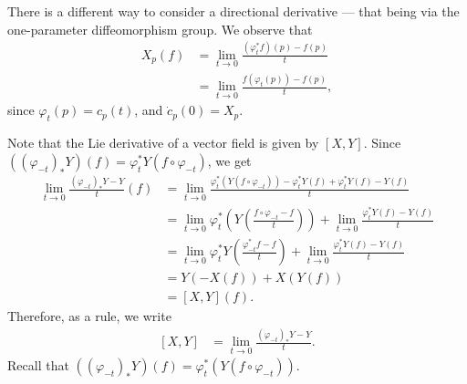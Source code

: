 \documentclass[10pt]{mypackage}
\begin{document}
There is a different way to consider a directional derivative --- that being via the one-parameter diffeomorphism group. We observe that
\begin{align*}
  X_p(f) &= \lim_{t\rightarrow 0} \frac{\left( \varphi_t^{\ast}f \right)(p) - f(p)}{t}\\
         &= \lim_{t\rightarrow 0}\frac{f\left( \varphi_t(p) \right) - f(p)}{t},
\end{align*}
since $\varphi_t(p) = c_p(t)$, and $ \dot{c}_p(0) = X_p $.\newline

Note that the Lie derivative of a vector field is given by $ \left[ X,Y \right] $. Since $\left( \left( \varphi_{-t} \right)_{\ast} Y\right)(f) = \varphi_t^{\ast}Y\left( f\circ\varphi_{-t} \right)$, we get
\begin{align*}
  \lim_{t\rightarrow 0} \frac{\left( \varphi_{-t} \right)_{\ast}Y - Y}{t}(f) &= \lim_{t\rightarrow 0} \frac{\varphi_t^{\ast}\left( Y\left( f\circ\varphi_{-t} \right) \right) - \varphi_t^{\ast}Y(f) + \varphi_t^{\ast}Y(f) - Y(f)}{t}\\
                                                                             &= \lim_{t\rightarrow 0} \varphi_t^{\ast}\left( Y\left( \frac{f\circ\varphi_{-t}-f}{t} \right) \right) + \lim_{t\rightarrow 0} \frac{\varphi_t^{\ast}Y(f) - Y(f)}{t}\\
                                                                             &= \lim_{t\rightarrow 0} \varphi_t^{\ast}Y\left( \frac{\varphi_{-t}^{\ast}f - f}{t} \right) + \lim_{t\rightarrow 0} \frac{\varphi_t^{\ast}Y(f) - Y(f)}{t}\\
                                                                             &= Y\left( -X(f) \right) + X\left( Y(f) \right)\\
                                                                             &= \left[ X,Y \right](f).
\end{align*}
Therefore, as a rule, we write
\begin{align*}
  \left[ X,Y \right] &= \lim_{t\rightarrow 0} \frac{\left( \varphi_{-t} \right)_{\ast}Y - Y}{t}.
\end{align*}
Recall that $\left( \left( \varphi_{-t} \right)_{\ast}Y \right)(f) = \varphi_t^{\ast}\left( Y\left( f\circ\varphi_{-t} \right) \right)$.\newline
\end{document}
